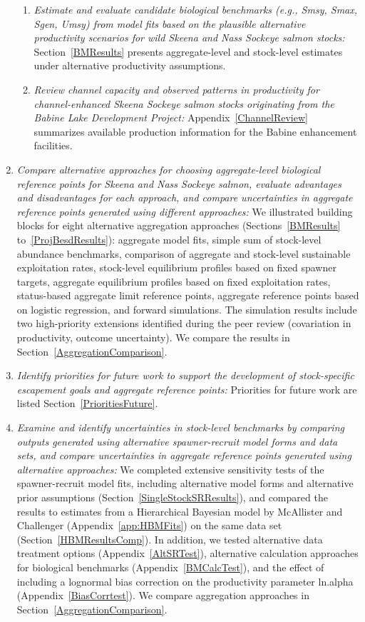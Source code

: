 \documentclass[french,11pt]{book}
\begin{document}
\begin{enumerate}
\begin{enumerate}
  \item
    \emph{Estimate and evaluate candidate biological benchmarks (e.g., Smsy, Smax, Sgen, Umsy) from model fits based on the plausible alternative productivity scenarios for wild Skeena and Nass Sockeye salmon stocks:} Section~\ref{BMResults} presents aggregate-level and stock-level estimates under alternative productivity assumptions.
  \item
    \emph{Review channel capacity and observed patterns in productivity for channel-enhanced Skeena Sockeye salmon stocks originating from the Babine Lake Development Project:} Appendix~\ref{ChannelReview} summarizes available production information for the Babine enhancement facilities.
  \end{enumerate}
\item
  \emph{Compare alternative approaches for choosing aggregate-level biological reference points for Skeena and Nass Sockeye salmon, evaluate advantages and disadvantages for each approach, and compare uncertainties in aggregate reference points generated using different approaches:} We illustrated building blocks for eight alternative aggregation approaches (Sections~\ref{BMResults} to~\ref{ProjBesdResults}): aggregate model fits, simple sum of stock-level abundance benchmarks, comparison of aggregate and stock-level sustainable exploitation rates, stock-level equilibrium profiles based on fixed spawner targets, aggregate equilibrium profiles based on fixed exploitation rates, status-based aggregate limit reference points, aggregate reference points based on logistic regression, and forward simulations. The simulation results include two high-priority extensions identified during the peer review (covariation in productivity, outcome uncertainty). We compare the results in Section~\ref{AggregationComparison}.
\item
  \emph{Identify priorities for future work to support the development of stock-specific escapement goals and aggregate reference points:} Priorities for future work are listed Section~\ref{PrioritiesFuture}.
\item
  \emph{Examine and identify uncertainties in stock-level benchmarks by comparing outputs generated using alternative spawner-recruit model forms and data sets, and compare uncertainties in aggregate reference points generated using alternative approaches:} We completed extensive sensitivity tests of the spawner-recruit model fits, including alternative model forms and alternative prior assumptions (Section~\ref{SingleStockSRResults}), and compared the results to estimates from a Hierarchical Bayesian model by McAllister and Challenger (Appendix~\ref{app:HBMFits}) on the same data set (Section~\ref{HBMResultsComp}). In addition, we tested alternative data treatment options (Appendix~\ref{AltSRTest}), alternative calculation approaches for biological benchmarks (Appendix~\ref{BMCalcTest}), and the effect of including a lognormal bias correction on the productivity parameter ln.alpha (Appendix~\ref{BiasCorrtest}). We compare aggregation approaches in Section~\ref{AggregationComparison}.
\end{enumerate}
\clearpage
\end{document}
